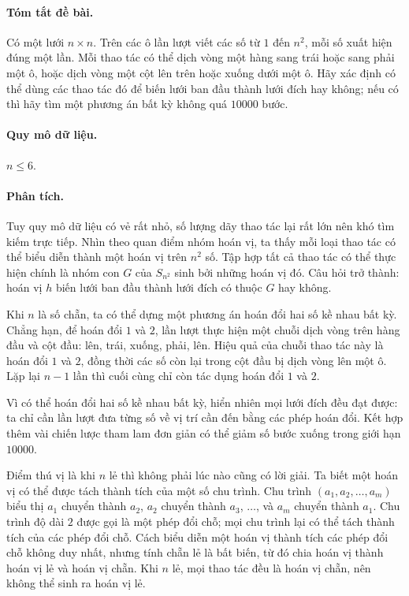\documentclass[11pt]{article}
\begin{document}
\paragraph{Tóm tắt đề bài.}
Có một lưới \(n\times n\). Trên các ô lần lượt viết các số từ \(1\) đến
\(n^2\), mỗi số xuất hiện đúng một lần. Mỗi thao tác có thể dịch vòng một hàng
sang trái hoặc sang phải một ô, hoặc dịch vòng một cột lên trên hoặc xuống
dưới một ô. Hãy xác định có thể dùng các thao tác đó để biến lưới ban đầu thành
lưới đích hay không; nếu có thì hãy tìm một phương án bất kỳ không quá
\(10000\) bước.

\paragraph{Quy mô dữ liệu.}
\(n\le 6\).

\paragraph{Phân tích.}
Tuy quy mô dữ liệu có vẻ rất nhỏ, số lượng dãy thao tác lại rất lớn nên khó tìm
kiếm trực tiếp. Nhìn theo quan điểm nhóm hoán vị, ta thấy mỗi loại thao tác có
thể biểu diễn thành một hoán vị trên \(n^2\) số. Tập hợp tất cả thao tác có thể
thực hiện chính là nhóm con \(G\) của \(S_{n^2}\) sinh bởi những hoán vị đó.
Câu hỏi trở thành: hoán vị \(h\) biến lưới ban đầu thành lưới đích có thuộc
\(G\) hay không.

Khi \(n\) là số chẵn, ta có thể dựng một phương án hoán đổi hai số kề nhau bất
kỳ. Chẳng hạn, để hoán đổi \(1\) và \(2\), lần lượt thực hiện một chuỗi dịch
vòng trên hàng đầu và cột đầu: lên, trái, xuống, phải, lên. Hiệu
quả của chuỗi thao tác này là hoán đổi \(1\) và \(2\), đồng thời các số còn lại
trong cột đầu bị dịch vòng lên một ô. Lặp lại \(n-1\) lần thì cuối cùng chỉ còn
tác dụng hoán đổi \(1\) và \(2\).

Vì có thể hoán đổi hai số kề nhau bất kỳ, hiển nhiên mọi lưới đích đều đạt
được: ta chỉ cần lần lượt đưa từng số về vị trí cần đến bằng các phép hoán đổi.
Kết hợp thêm vài chiến lược tham lam đơn giản có thể giảm số bước xuống trong
giới hạn \(10000\).

Điểm thú vị là khi \(n\) lẻ thì không phải lúc nào cũng có lời giải. Ta biết
một hoán vị có thể được tách thành tích của một số chu trình. Chu trình
\((a_1,a_2,\ldots,a_m)\) biểu thị \(a_1\) chuyển thành \(a_2\), \(a_2\) chuyển
thành \(a_3\), \(\ldots\), và \(a_m\) chuyển thành \(a_1\). Chu trình độ dài
\(2\) được gọi là một phép đổi chỗ; mọi chu trình lại có thể tách thành tích
của các phép đổi chỗ. Cách biểu diễn một hoán vị thành tích các phép đổi chỗ
không duy nhất, nhưng tính chẵn lẻ là bất biến, từ đó chia hoán vị thành hoán
vị lẻ và hoán vị chẵn. Khi \(n\) lẻ, mọi thao tác đều là hoán vị chẵn, nên không
thể sinh ra hoán vị lẻ.
\end{document}
